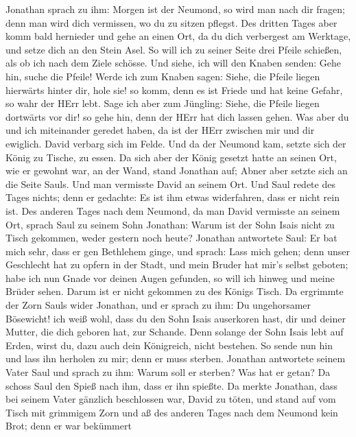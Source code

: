 Jonathan sprach zu ihm: Morgen ist der Neumond, so wird man nach dir
fragen; denn man wird dich vermissen, wo du zu sitzen pflegst.
 Des dritten Tages aber komm bald hernieder und gehe an
einen Ort, da du dich verbergest am Werktage, und setze dich an den
Stein Asel.  So will ich zu seiner Seite drei Pfeile
schießen, als ob ich nach dem Ziele schösse.  Und siehe,
ich will den Knaben senden: Gehe hin, suche die Pfeile! Werde ich zum
Knaben sagen: Siehe, die Pfeile liegen hierwärts hinter dir, hole sie!
so komm, denn es ist Friede und hat keine Gefahr, so wahr der HErr lebt.
 Sage ich aber zum Jüngling: Siehe, die Pfeile liegen
dortwärts vor dir! so gehe hin, denn der HErr hat dich lassen gehen.
 Was aber du und ich miteinander geredet haben, da ist der
HErr zwischen mir und dir ewiglich.  David verbarg sich im
Felde. Und da der Neumond kam, setzte sich der König zu Tische, zu
essen.  Da sich aber der König gesetzt hatte an seinen Ort,
wie er gewohnt war, an der Wand, stand Jonathan auf; Abner aber setzte
sich an die Seite Sauls. Und man vermisste David an seinem Ort.
 Und Saul redete des Tages nichts; denn er gedachte: Es ist
ihm etwas widerfahren, dass er nicht rein ist.  Des anderen
Tages nach dem Neumond, da man David vermisste an seinem Ort, sprach
Saul zu seinem Sohn Jonathan: Warum ist der Sohn Isais nicht zu Tisch
gekommen, weder gestern noch heute?  Jonathan antwortete
Saul: Er bat mich sehr, dass er gen Bethlehem ginge,  und
sprach: Lass mich gehen; denn unser Geschlecht hat zu opfern in der
Stadt, und mein Bruder hat mir's selbst geboten; habe ich nun Gnade vor
deinen Augen gefunden, so will ich hinweg und meine Brüder sehen. Darum
ist er nicht gekommen zu des Königs Tisch.  Da ergrimmte
der Zorn Sauls wider Jonathan, und er sprach zu ihm: Du ungehorsamer
Bösewicht! ich weiß wohl, dass du den Sohn Isais auserkoren hast, dir
und deiner Mutter, die dich geboren hat, zur Schande.  Denn
solange der Sohn Isais lebt auf Erden, wirst du, dazu auch dein
Königreich, nicht bestehen. So sende nun hin und lass ihn herholen zu
mir; denn er muss sterben.  Jonathan antwortete seinem
Vater Saul und sprach zu ihm: Warum soll er sterben? Was hat er getan?
 Da schoss Saul den Spieß nach ihm, dass er ihn spießte. Da
merkte Jonathan, dass bei seinem Vater gänzlich beschlossen war, David
zu töten,  und stand auf vom Tisch mit grimmigem Zorn und
aß des anderen Tages nach dem Neumond kein Brot; denn er war bekümmert
